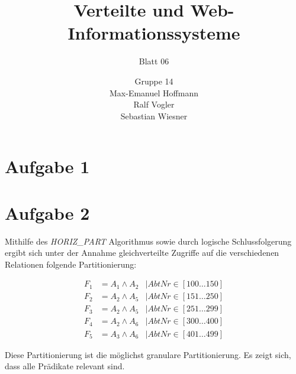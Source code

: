 \documentclass[11pt,a4paper]{scrartcl}
\begin{document}
\author{Gruppe 14\\Max-Emanuel Hoffmann\\Ralf Vogler\\Sebastian Wiesner}
\title{Verteilte und Web-Informationssysteme}
\subtitle{Blatt 06}

\maketitle

\section*{Aufgabe 1}

\section*{Aufgabe 2}

Mithilfe des \emph{HORIZ\_PART} Algorithmus sowie durch logische
Schlussfolgerung ergibt sich unter der Annahme gleichverteilte Zugriffe auf die
verschiedenen Relationen folgende Partitionierung:

\begin{align*}
  F_1 &= A_1 \wedge A_2 & | AbtNr \in \left[100 \ldots 150\right]\\
  F_2 &= A_2 \wedge A_5 & | AbtNr \in \left[151 \ldots 250\right]\\
  F_3 &= A_2 \wedge A_5 & | AbtNr \in \left[251 \ldots 299\right]\\
  F_4 &= A_2 \wedge A_6 & | AbtNr \in \left[300 \ldots 400\right]\\
  F_5 &= A_3 \wedge A_6 & | AbtNr \in \left[401 \ldots 499\right]
\end{align*}

Diese Partitionierung ist die möglichst granulare Partitionierung.  Es zeigt
sich, dass alle Prädikate relevant sind.
\end{document}
